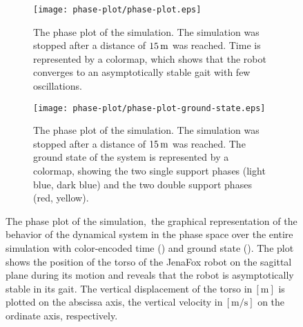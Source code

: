\begin{figure}[H]%
    \centering%
    \begin{subfigure}[t]{0.8\linewidth}%
        \centering%
        \texttt{[image: phase-plot/phase-plot.eps]}
        \caption{The phase plot of the simulation. The simulation was stopped after a distance of $15\,\textrm{\si{\metre}}$ was reached. Time is represented by a colormap, which shows that the robot converges to an asymptotically stable gait with few oscillations.}%
        \label{fig:phase-plot-time}%
        \vspace*{2mm}%
    \end{subfigure}%
    \vfil%
    \begin{subfigure}[b]{0.8\linewidth}%
        \texttt{[image: phase-plot/phase-plot-ground-state.eps]}
        \caption{The phase plot of the simulation. The simulation was stopped after a distance of $15\,\textrm{\si{\metre}}$ was reached. The ground state of the system is represented by a colormap, showing the two single support phases (light blue, dark blue) and the two double support phases (red, yellow).}%
        \label{fig:phase-plot-ground-state}%
    \end{subfigure}%
    \caption{The phase plot of the simulation,~\ie the graphical representation of the behavior of the dynamical system in the phase space over the entire simulation with color-encoded time () and ground state (). The plot shows the position of the torso of the JenaFox robot on the sagittal plane during its motion and reveals that the robot is asymptotically stable in its gait. The vertical displacement of the torso in$~\left[\si{\metre}\right]$ is plotted on the abscissa axis, the vertical velocity in$~\left[\si{\metre\per\second}\right]$ on the ordinate axis, respectively.}%
    \label{fig:phase-plot}%
\end{figure}%
